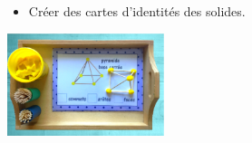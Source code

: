 \begin{exercice*}
\begin{description}
\begin{itemize}
         \item Créer des cartes d'identités des solides.
      \end{itemize}
      \begin{center}
         \includegraphics[height=3cm]{Geometrie_did/Images/Geo6_activites_portrait}
      \end{center}
\end{description}
\end{exercice*}

